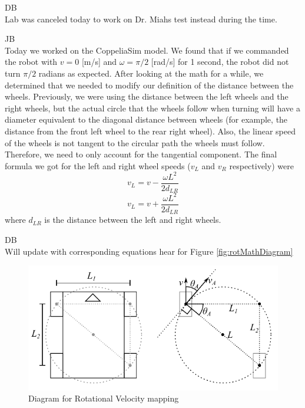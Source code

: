 \documentclass[fontsize=11pt, %
                             paper=letter, %
                             openany, %
                             captions=tableheading,
                             index=totoc,
                             hyperref]{labbook}
\begin{document}
\begin{addmargin}[0cm]{0cm}

DB\\
Lab was canceled today to work on Dr. Miahs test instead during the time.


JB\\
Today we worked on the CoppeliaSim model. We found that if we commanded the robot with $v = 0$ [m/s] and $\omega = \pi/2$ [rad/s] for 1 second, the robot did not turn $\pi/2$ radians as expected. After looking at the math for a while, we determined that we needed to modify our definition of the distance between the wheels. Previously, we were using the distance between the left wheels and the right wheels, but the actual circle that the wheels follow when turning will have a diameter equivalent to the diagonal distance between wheels (for example, the distance from the front left wheel to the rear right wheel). Also, the linear speed of the wheels is not tangent to the circular path the wheels must follow. Therefore, we need to only account for the tangential component. The final formula we got for the left and right wheel speeds ($v_L$ and $v_R$ respectively) were
$$v_L = v - \frac{\omega L^2}{2d_{LR}}$$
$$v_L = v + \frac{\omega L^2}{2d_{LR}}$$
where $d_{LR}$ is the distance between the left and right wheels.

\vspace*{12pt}DB\\
Will update with corresponding equations hear for
Figure \autoref{fig:rotMathDiagram}
\begin{figure}
    \centering
    \includegraphics[width=6in]{figs/roatationalVelocityMathDiagram}
    \caption{Diagram for Rotational Velocity mapping}
    \label{fig:rotMathDiagram}
\end{figure}


\end{addmargin}
\end{document}
